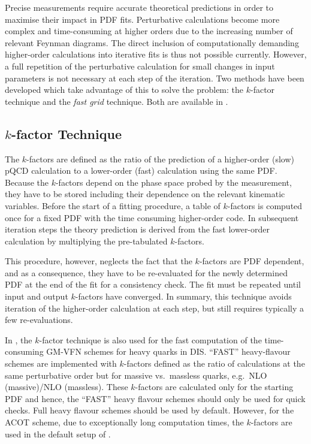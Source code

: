 
Precise measurements
require accurate theoretical predictions in
order to maximise their impact in PDF fits.  Perturbative
calculations become more complex and time-consuming at higher  
orders due to the increasing number of relevant Feynman diagrams.
The direct inclusion of computationally
demanding higher-order calculations into iterative fits is thus
not possible currently. However, a full repetition of the
perturbative calculation for small changes in input parameters is
not necessary at each step of the iteration.
Two methods have been developed which take advantage of this
to solve the problem: the $k$-factor technique and the
\emph{fast grid} technique. Both are available in \fitter.

\subsection{$k$-factor Technique}
  The $k$-factors are defined as the ratio of the prediction of a
  higher-order (slow) pQCD calculation to a lower-order (fast)
  calculation using the same PDF. Because the $k$-factors depend on the phase space
  probed by the measurement, they have to be stored  
including their dependence on
  the relevant kinematic variables. Before the start of  
  a fitting procedure, a table of $k$-factors is computed once
  for a fixed PDF with the time consuming higher-order code. In
  subsequent iteration steps the theory prediction is derived from the
  fast lower-order calculation by multiplying the pre-tabulated
  $k$-factors.

  This procedure, however, neglects the fact that the $k$-factors are 
  PDF dependent, and 
  as a consequence, they have to be re-evaluated
  for the newly determined PDF at the end of the fit for a consistency
  check. The fit must be repeated until input and output
  $k$-factors have converged. In summary, this technique avoids
  iteration of the higher-order calculation at each step, but still
  requires typically a few re-evaluations.

In \fitter, the $k$-factor technique is also used for the fast 
computation of the time-consuming GM-VFN schemes for heavy quarks in DIS.
``FAST'' heavy-flavour schemes are implemented
with $k$-factors defined as the ratio of
calculations at the same perturbative order but for massive vs.\
massless quarks, e.g.\ NLO (massive)/NLO (massless).
These $k$-factors are calculated only for the
starting PDF and hence, the ``FAST'' heavy flavour schemes should
only be used for quick checks. Full heavy flavour schemes
should be used by default. However, for the ACOT scheme,
due to exceptionally long computation times, the $k$-factors are used in 
the default setup of \fitter. 

